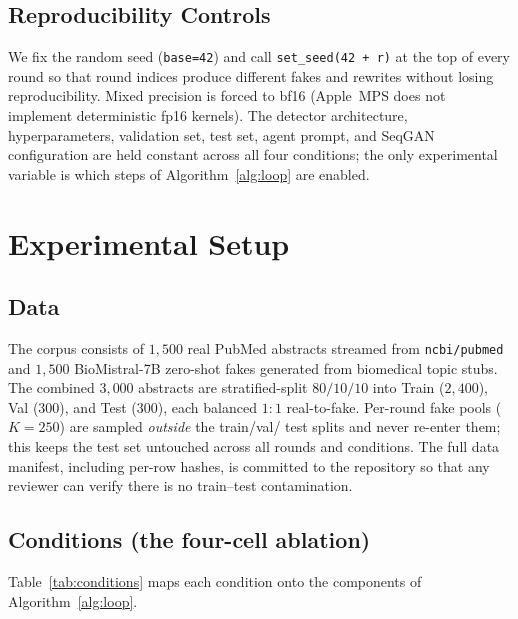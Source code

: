 \documentclass[conference]{IEEEtran}
\begin{document}
\subsection{Reproducibility Controls}
\label{ssec:repro}
We fix the random seed (\texttt{base=42}) and call
\texttt{set\_seed(42 + r)} at the top of every round so that round indices
produce different fakes and rewrites without losing reproducibility. Mixed
precision is forced to bf16 (Apple~MPS does not implement deterministic
fp16 kernels). The detector architecture, hyperparameters, validation set,
test set, agent prompt, and SeqGAN configuration are held constant across
all four conditions; the only experimental variable is which steps of
Algorithm~\ref{alg:loop} are enabled.

\section{Experimental Setup}
\label{sec:setup}

\subsection{Data}
\label{ssec:data}
The corpus consists of \(1{,}500\) real PubMed abstracts streamed from
\texttt{ncbi/pubmed} and \(1{,}500\) BioMistral-7B zero-shot fakes
generated from biomedical topic stubs. The combined \(3{,}000\) abstracts
are stratified-split \(80/10/10\) into Train (\(2{,}400\)), Val
(\(300\)), and Test (\(300\)), each balanced \(1\!:\!1\) real-to-fake.
Per-round fake pools (\(K=250\)) are sampled \emph{outside} the train/val/
test splits and never re-enter them; this keeps the test set untouched
across all rounds and conditions. The full data manifest, including
per-row hashes, is committed to the repository so that any reviewer can
verify there is no train--test contamination.

\subsection{Conditions (the four-cell ablation)}
\label{ssec:conditions}
Table~\ref{tab:conditions} maps each condition onto the components of
Algorithm~\ref{alg:loop}.
\end{document}
